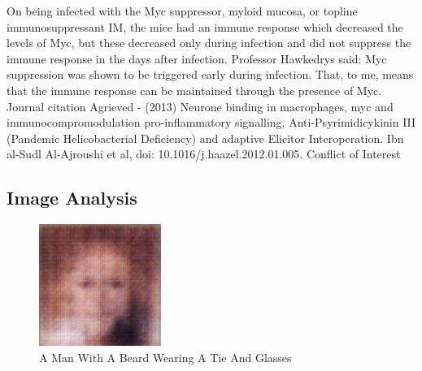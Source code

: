 \documentclass{article}%
\begin{document}
On being infected with the Myc suppressor, myloid mucosa, or topline immunosuppressant IM, the mice had an immune response which decreased the levels of Myc, but these decreased only during infection and did not suppress the immune response in the days after infection.\newline%
Professor Hawkedrys said: Myc suppression was shown to be triggered early during infection. That, to me, means that the immune response can be maintained through the presence of Myc.\newline%
Journal citation\newline%
Agrieved {-} (2013) Neurone binding in macrophages, myc and immunocompromodulation pro{-}inflammatory signalling, Anti{-}Psyrimidicykinin III (Pandemic Helicobacterial Deficiency) and adaptive Elicitor Interoperation. Ibn al{-}Sudl Al{-}Ajroushi et al, doi: 10.1016/j.haazel.2012.01.005.\newline%
Conflict of Interest

%
\subsection{Image Analysis}%
\label{subsec:ImageAnalysis}%


\begin{figure}[h!]%
\centering%
\includegraphics[width=150px]{500_fake_images/samples_5_327.png}%
\caption{A Man With A Beard Wearing A Tie And Glasses}%
\end{figure}

%
\end{document}
